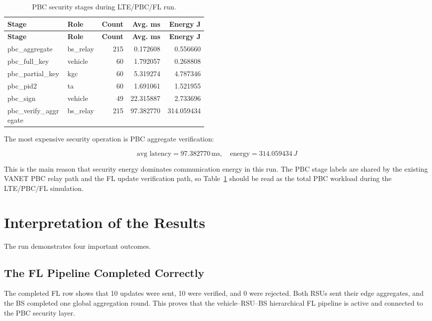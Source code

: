 \documentclass[11pt,a4paper]{article}
\newcommand{\ms}{\,\mathrm{ms}}
\begin{document}
\begin{longtable}{p{0.30\linewidth}p{0.17\linewidth}r r r}
\caption{PBC security stages during LTE/PBC/FL run.}\label{tab:pbc-stages}\\
\toprule
\textbf{Stage} & \textbf{Role} & \textbf{Count} & \textbf{Avg. ms} & \textbf{Energy J} \\
\midrule
\endfirsthead
\toprule
\textbf{Stage} & \textbf{Role} & \textbf{Count} & \textbf{Avg. ms} & \textbf{Energy J} \\
\midrule
\endhead
pbc\_aggregate & bs\_relay & 215 & 0.172608 & 0.556660 \\
pbc\_full\_key & vehicle & 60 & 1.792057 & 0.268808 \\
pbc\_partial\_key & kgc & 60 & 5.319274 & 4.787346 \\
pbc\_pid2 & ta & 60 & 1.691061 & 1.521955 \\
pbc\_sign & vehicle & 49 & 22.315887 & 2.733696 \\
pbc\_verify\_aggregate & bs\_relay & 215 & 97.382770 & 314.059434 \\
\bottomrule
\end{longtable}

The most expensive security operation is PBC aggregate verification:

\[
\text{avg latency}=97.382770\ms,
\quad \text{energy}=314.059434\,J
\]

This is the main reason that security energy dominates communication energy in
this run. The PBC stage labels are shared by the existing VANET PBC relay path
and the FL update verification path, so Table~\ref{tab:pbc-stages} should be
read as the total PBC workload during the LTE/PBC/FL simulation.

\section{Interpretation of the Results}

The run demonstrates four important outcomes.

\subsection{The FL Pipeline Completed Correctly}

The completed FL row shows that 10 updates were sent, 10 were verified, and 0
were rejected. Both RSUs sent their edge aggregates, and the BS completed one
global aggregation round. This proves that the vehicle--RSU--BS hierarchical FL
pipeline is active and connected to the PBC security layer.
\end{document}
